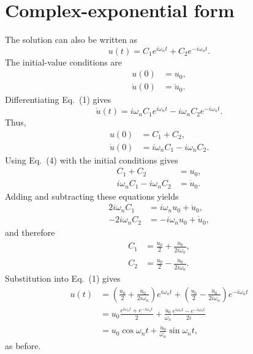 
\section*{Complex-exponential form}

The solution can also be written as
\begin{equation}
    u(t)=C_1e^{i\omega_n t}+C_2e^{-i\omega_n t}.
    \tag{1}
\end{equation}
The initial-value conditions are
\begin{equation}
\begin{aligned}
    u(0) &= u_0,\\
    \dot{u}(0) &= \dot{u}_0.
\end{aligned}
    \tag{2}
\end{equation}
Differentiating Eq.~(1) gives
\begin{equation}
    \dot{u}(t)=i\omega_n C_1e^{i\omega_n t}-i\omega_n C_2e^{-i\omega_n t}.
    \tag{3}
\end{equation}
Thus,
\begin{equation}
\begin{aligned}
    u(0) &= C_1+C_2,\\
    \dot{u}(0) &= i\omega_n C_1-i\omega_n C_2.
\end{aligned}
    \tag{4}
\end{equation}
Using Eq.~(4) with the initial conditions gives
\begin{equation}
\begin{aligned}
    C_1+C_2 &= u_0,\\
    i\omega_n C_1-i\omega_n C_2 &= \dot{u}_0.
\end{aligned}
    \tag{5}
\end{equation}
Adding and subtracting these equations yields
\begin{equation}
\begin{aligned}
    2i\omega_n C_1 &= i\omega_n u_0+\dot{u}_0,\\
    -2i\omega_n C_2 &= -i\omega_n u_0+\dot{u}_0,
\end{aligned}
    \tag{6}
\end{equation}
and therefore
\begin{equation}
\begin{aligned}
    C_1 &= \frac{u_0}{2}+\frac{\dot{u}_0}{2i\omega_n},\\
    C_2 &= \frac{u_0}{2}-\frac{\dot{u}_0}{2i\omega_n}.
\end{aligned}
    \tag{7}
\end{equation}
Substitution into Eq.~(1) gives
\begin{align*}
u(t) &= \left(\frac{u_0}{2}+\frac{\dot{u}_0}{2i\omega_n}\right)e^{i\omega_n t}
 +\left(\frac{u_0}{2}-\frac{\dot{u}_0}{2i\omega_n}\right)e^{-i\omega_n t}\\
&=u_0\frac{e^{i\omega_n t}+e^{-i\omega_n t}}{2}
 +\frac{\dot{u}_0}{\omega_n}\frac{e^{i\omega_n t}-e^{-i\omega_n t}}{2i}\\
&=u_0\cos\omega_n t+\frac{\dot{u}_0}{\omega_n}\sin\omega_n t,
\end{align*}
as before.
